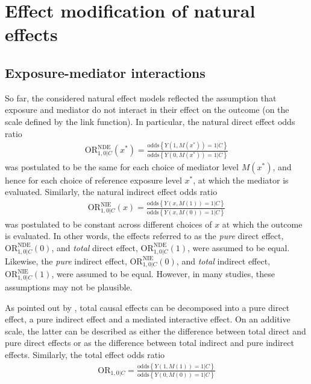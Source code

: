 \documentclass[nojss]{jss}
\begin{document}
\newpage
\section{Effect modification of natural effects}\label{modmed}
\subsection{Exposure-mediator interactions}\label{subsec:ia}
So far, the considered natural effect models reflected the assumption that exposure and mediator do not interact in their effect on the outcome (on the scale defined by the link function). In particular, the natural direct effect odds ratio 
\begin{align*}
\mbox{OR}^{\text{NDE}}_{1,0|C}(x^*) = \frac{\mbox{odds}\left\{Y(1,M(x^*))=1|C\right\}}{\mbox{odds}\left\{Y(0,M(x^*))=1|C\right\}}
\end{align*}
was postulated to be the same for each choice of mediator level $M(x^*)$, and hence for each choice of reference exposure level $x^*$, at which the mediator is evaluated. Similarly, the natural indirect effect odds ratio 
\begin{align*}
\mbox{OR}^{\text{NIE}}_{1,0|C}(x) = \frac{\mbox{odds}\left\{Y(x,M(1))=1|C\right\}}{\mbox{odds}\left\{Y(x,M(0))=1|C\right\}}
\end{align*}
was postulated to be constant across different choices of $x$ at which the outcome is evaluated. 
In other words, the effects \cite{Greenland1992} referred to as the \emph{pure} direct effect, $\mbox{OR}^{\text{NDE}}_{1,0|C}(0)$, and \emph{total} direct effect, $\mbox{OR}^{\text{NDE}}_{1,0|C}(1)$, were assumed to be equal. Likewise, the \emph{pure} indirect effect, $\mbox{OR}^{\text{NIE}}_{1,0|C}(0)$, and \emph{total} indirect effect, $\mbox{OR}^{\text{NIE}}_{1,0|C}(1)$, were assumed to be equal. However, in many studies, these assumptions may not be plausible.
\par As pointed out by \cite{VanderWeele2013a}, total causal effects can be decomposed into a pure direct effect, a pure indirect effect and a mediated interactive effect. On an additive scale, the latter can be described as either the difference between total direct and pure direct effects or as the difference between total indirect and pure indirect effects. Similarly, the total effect odds ratio 
\begin{align*}
\mbox{OR}_{1,0|C} = \frac{\mbox{odds}\left\{Y(1,M(1))=1|C\right\}}{\mbox{odds}\left\{Y(0,M(0))=1|C\right\}}
\end{align*}
\end{document}
